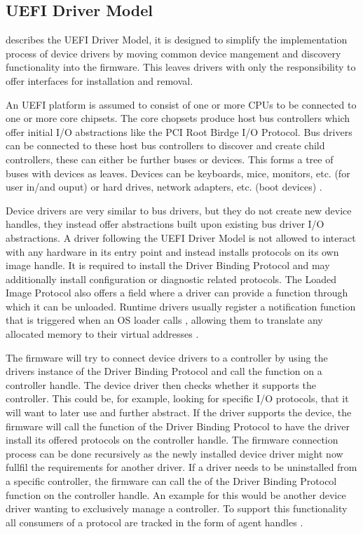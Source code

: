 \subsection{\acs{UEFI} Driver Model}

\cite[Section 2.5]{uefi-spec} describes the \acs{UEFI} Driver Model, it is designed to simplify the implementation process of device drivers by moving common device mangement and discovery functionality into the firmware.
This leaves drivers with only the responsibility to offer interfaces for installation and removal.

An \ac{UEFI} platform is assumed to consist of one or more \acp{CPU} to be connected to one or more core chipsets.
The core chopsets produce host bus controllers which offer initial \ac{I/O} abstractions like the \ac{PCI} Root Birdge \ac{I/O} Protocol.
Bus drivers can be connected to these host bus controllers to discover and create child controllers, these can either be further buses or devices.
This forms a tree of buses with devices as leaves.
Devices can be keyboards, mice, monitors, etc. (for user in\-/and ouput) or hard drives, network adapters, etc. (boot devices) \cite[Section 2.5]{uefi-spec}.

Device drivers are very similar to bus drivers, but they do not create new device handles, they instead offer abstractions built upon existing bus driver \ac{I/O} abstractions.
A driver following the \ac{UEFI} Driver Model is not allowed to interact with any hardware in its entry point and instead installs protocols on its own image handle.
It is required to install the Driver Binding Protocol and may additionally install configuration or diagnostic related protocols.
The Loaded Image Protocol also offers a field where a driver can provide a function through which it can be unloaded.
Runtime drivers usually register a notification function that is triggered when an \ac{OS} loader calls , allowing them to translate any allocated memory to their virtual addresses \cite[Section 2.5.2]{uefi-spec}.

The firmware will try to connect device drivers to a controller by using the drivers instance of the Driver Binding Protocol and call the  function on a controller handle.
The device driver then checks whether it supports the controller.
This could be, for example, looking for specific \ac{I/O} protocols, that it will want to later use and further abstract.
If the driver supports the device, the firmware will call the  function of the Driver Binding Protocol to have the driver install its offered protocols on the controller handle.
The firmware connection process can be done recursively as the newly installed device driver might now fullfil the requirements for another driver.
If a driver needs to be uninstalled from a specific controller, the firmware can call the  of the Driver Binding Protocol function on the controller handle.
An example for this would be another device driver wanting to exclusively manage a controller.
To support this functionality all consumers of a protocol are tracked in the form of agent handles \cite[Section 2.5.4]{uefi-spec}.

